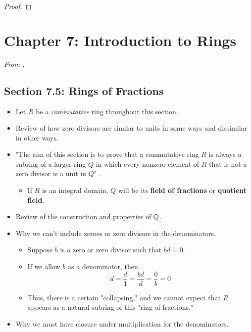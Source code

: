 \documentclass[../notes.tex]{subfiles}
\begin{document}
\begin{itemize}
\begin{proof}
    \end{proof}
\end{itemize}



\section{Chapter 7: Introduction to Rings}
\emph{From \textcite{bib:DummitFoote}.}
\subsection*{Section 7.5: Rings of Fractions}
\begin{itemize}
    \item {}Let $R$ be a \emph{commutative} ring throughout this section.
    \item Review of how zero divisors are similar to units in some ways and dissimilar in other ways.
    \item "The aim of this section is to prove that a commutative ring $R$ is always a subring of a larger ring $Q$ in which every nonzero element of $R$ that is not a zero divisor is a unit in $Q$" \parencite[260]{bib:DummitFoote}.
    \begin{itemize}
        \item If $R$ is an integral domain, $Q$ will be its \textbf{field of fractions} or \textbf{quotient field}.
    \end{itemize}
    \item Review of the construction and properties of $\mathbb{Q}$.
    \item Why we can't include zeroes or zero divisors in the denominators.
    \begin{itemize}
        \item Suppose $b$ is a zero or zero divisor such that $bd=0$.
        \item If we allow $b$ as a denominator, then
        \begin{equation*}
            d = \frac{d}{1}
            = \frac{bd}{d}
            = \frac{0}{b}
            = 0
        \end{equation*}
        \item Thus, there is a certain "collapsing," and we cannot expect that $R$ appears as a natural subring of this "ring of fractions."
    \end{itemize}
    \item Why we must have closure under multiplication for the denominators.
    \begin{itemize}

\end{itemize}
\end{itemize}
\end{document}
